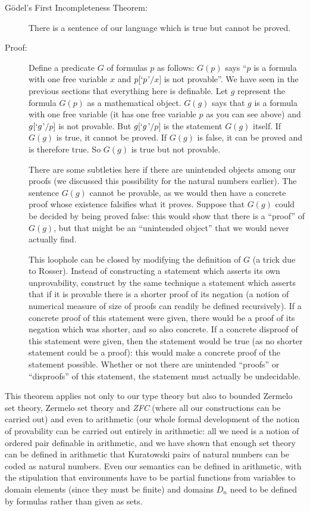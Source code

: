 \documentclass[12pt]{book}
\begin{document}
\begin{description}

\item[G\"odel's First Incompleteness Theorem:] There is a sentence of
our language which is true but cannot be proved.

\item[Proof:] Define a predicate $G$ of formulas $p$ as follows:
$G(p)$ says ``$p$ is a formula with one free variable $x$ and
$p[`p$'$/x]$ is not provable''.  We have seen in the previous sections
that everything here is definable.  Let $g$ represent the formula
$G(p)$ as a mathematical object.  $G(g)$ says that $g$ is a formula
with one free variable (it has one free variable $p$ as you can see
above) and $g[`g$'$/p]$ is not provable.  But $g[`g$'$/p]$ is the
statement $G(g)$ itself.  If $G(g)$ is true, it cannot be proved.  If
$G(g)$ is false, it can be proved and is therefore true.  So $G(g)$ is
true but not provable.

There are some subtleties here if there are unintended objects among
our proofs (we discussed this possibility for the natural numbers
earlier).  The sentence $G(g)$ cannot be provable, as we would then
have a concrete proof whose existence falsifies what it proves.
Suppose that $G(g)$ could be decided by being proved false: this would
show that there is a ``proof'' of $G(g)$, but that might be an
``unintended object'' that we would never actually find.

This loophole can be closed by modifying the definition of $G$ (a
trick due to Rosser).  Instead of constructing a statement which
asserts its own unprovability, construct by the same technique a
statement which asserts that if it is provable there is a shorter
proof of its negation (a notion of numerical measure of size of proofs
can readily be defined recursively).  If a concrete proof of this
statement were given, there would be a proof of its negation which was
shorter, and so also concrete.  If a concrete disproof of this
statement were given, then the statement would be true (as no shorter
statement could be a proof): this would make a concrete proof of the
statement possible.  Whether or not there are unintended ``proofs'' or
``disproofs'' of this statement, the statement must actually be
undecidable.

\end{description}

This theorem applies not only to our type theory but also to bounded
Zermelo set theory, Zermelo set theory and {\em ZFC\/} (where all our
constructions can be carried out) and even to arithmetic (our whole
formal development of the notion of provability can be carried out
entirely in arithmetic: all we need is a notion of ordered pair
definable in arithmetic, and we have shown that enough set theory can
be defined in arithmetic that Kuratowski pairs of natural numbers can
be coded as natural numbers.  Even our semantics can be defined in
arithmetic, with the stipulation that environments have to be partial
functions from variables to domain elements (since they must be
finite) and domains $D_n$ need to be defined by formulas rather than
given as sets.
\end{document}

